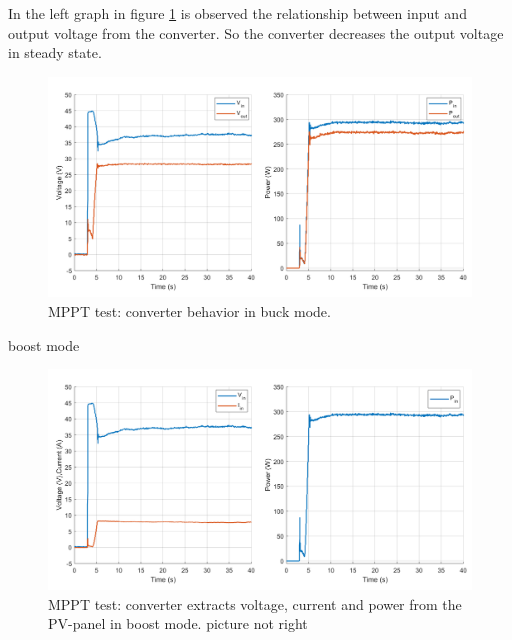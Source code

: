 In the left graph in figure \ref{MPPTtestbuckmode2} is observed the relationship between input and output voltage from the converter. So the converter decreases the output voltage in steady state.
 
\begin{figure}[H]
	\begin{center}
		\includegraphics[width=1\textwidth]{../Pictures/P1/Test/Buck_mode_MPPT_Vin_Vout_Pin_Pout}
		\caption{MPPT test: converter behavior in buck mode.}
		\label{MPPTtestbuckmode2}
	\end{center}	
\end{figure}



boost mode

\begin{figure}[H]
	\begin{center}
		\includegraphics[width=1\textwidth]{../Pictures/P1/Test/Buck_mode_MPPT_Vin_Iin_Pin}
		\caption{MPPT test: converter extracts voltage, current and power from the PV-panel in boost mode. picture not right}
		\label{MPPTtestboostmode1}
	\end{center}	
\end{figure}

